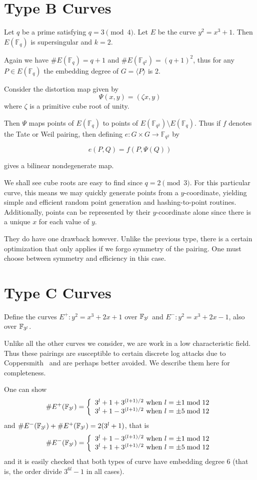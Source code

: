 \section {Type B Curves}

Let $q$ be a prime satisfying $q = 3 \pmod{4}$.
Let $E$ be the curve $y^2 = x^3 + 1$. Then
$E(\mathbb{F}_q)$ is supersingular and $k = 2$.

Again we have $\#E(\mathbb{F}_q) = q+1$ and $\#E(\mathbb{F}_{q^2}) = (q+1)^2$,
thus for any $P\in E(\mathbb{F}_q)$
the embedding degree of $G = \langle P \rangle$ is 2.

Consider the distortion map given by
\[ \Psi(x, y) = (\zeta x, y) \]
where $\zeta$ is a primitive cube root of unity.

Then $\Psi$ maps points of $E(\mathbb{F}_q)$ to points of
$E(\mathbb{F}_{q^2}) \setminus E(\mathbb{F}_q)$. Thus if $f$ denotes the
Tate or Weil pairing, then defining $e:G \times G \rightarrow \mathbb{F}_{q^2}$
by

\[ e(P,Q) = f(P, \Psi(Q)) \]

gives a bilinear nondegenerate map.

We shall see cube roots are easy to find since $q = 2 \pmod{3}$.
For this particular curve, this means we may quickly generate points from
a $y$-coordinate, yielding simple and efficient random point generation and
hashing-to-point routines.
Additionally,
points can be represented by their $y$-coordinate alone since there is
a unique $x$ for each value of $y$.

They do have one drawback however. Unlike the previous type,
there is a certain optimization that
only applies if we forgo symmetry of the pairing. One must choose between
symmetry and efficiency in this case.

\section {Type C Curves}

Define the curves $E^{+} : y^2 = x^3 + 2 x + 1$ over $\mathbb{F}_{3^l}$
and $E^{-} : y^2 = x^3 + 2 x - 1$, also over $\mathbb{F}_{3^l}$.

Unlike all the other curves we consider,
we are work in a low characteristic field. Thus these pairings
are susceptible to certain discrete log attacks due to
Coppersmith~\cite{coppersmith} and are perhaps better avoided.
We describe them here for completeness.

One can show
\[
\#E^+(\mathbb{F}_{3^l}) = \left \{ \begin{array}{rcl}
3^l + 1 + 3^{(l+1)/2} \mbox { when } l = \pm 1 \bmod 12 \\
3^l + 1 - 3^{(l+1)/2} \mbox { when } l = \pm 5 \bmod 12
\end{array} \right.
\]
and $\#E^-(\mathbb{F}_{3^l}) + \#E^+(\mathbb{F}_{3^l}) = 2(3^l + 1)$, that is
\[
\#E^-(\mathbb{F}_{3^l}) = \left \{ \begin{array}{rcl}
3^l + 1 - 3^{(l+1)/2} \mbox { when } l = \pm 1 \bmod 12 \\
3^l + 1 + 3^{(l+1)/2} \mbox { when } l = \pm 5 \bmod 12
\end{array} \right.
\]
and it is easily checked that both types of curve have embedding
degree 6 (that is, the order divide $3^{6l} -1$ in all cases).


